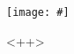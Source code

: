 \begin{figure}[H]
    \centering
    \texttt{[image: \#]}
    \caption{<++>}
    \label{fig:#}
\end{figure}
